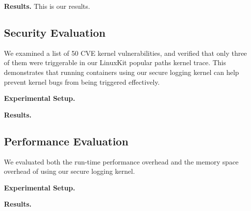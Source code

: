 \textbf{Results.}
This is our results.

\subsection{Security Evaluation}
\label{sec.evaluation.security} 
We examined a list of 50 CVE kernel vulnerabilities, and verified that only three of them were triggerable in our LinuxKit popular paths kernel trace. 
This demonstrates that running containers using our secure logging kernel can help prevent kernel bugs from being triggered effectively. 

\textbf{Experimental Setup.}

\textbf{Results.}

\subsection{Performance Evaluation}
\label{sec.evaluation.performance} 
We evaluated both the run-time performance overhead and the memory space overhead of using our secure logging kernel. 

\textbf{Experimental Setup.}

\textbf{Results.}
